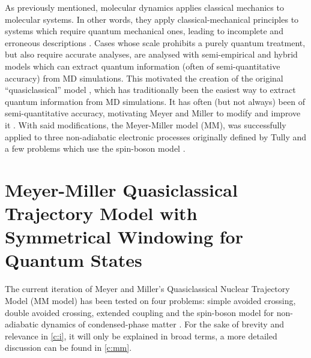 As previously mentioned, molecular dynamics applies classical mechanics to molecular systems. In other words, they apply classical-mechanical principles to systems which require quantum mechanical ones, leading to incomplete and erroneous descriptions \cite{moldyn}. Cases whose scale prohibits a purely quantum treatment, but also require accurate analyses, are analysed with semi-empirical and hybrid models which can extract quantum information (often of semi-quantitative accuracy) from MD simulations. This motivated the creation of the original ``quasiclassical'' model \cite{QC1}, which has traditionally been the easiest way to extract quantum information from MD simulations. It has often (but not always) been of semi-quantitative accuracy, motivating Meyer and Miller to modify and improve it \cite{cmsym}. With said modifications, the Meyer-Miller model (MM), was successfully applied to three non-adiabatic electronic processes originally defined by Tully and a few problems which use the spin-boson model \cite{tully,project}.
%
\section{Meyer-Miller Quasiclassical Trajectory Model with Symmetrical Windowing for Quantum States}\label{s:model}
%
The current iteration of Meyer and Miller's Quasiclassical Nuclear Trajectory Model (MM model) has been tested on four problems: simple avoided crossing, double avoided crossing, extended coupling and the spin-boson model for non-adiabatic dynamics of condensed-phase matter \cite{project}. For the sake of brevity and relevance in \cref{c:i}, it will only be explained in broad terms, a more detailed discussion can be found in \cref{c:mm}.
%
